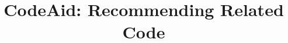 \documentclass[conference]{IEEEtran}
\begin{document}
\newcommand\todo[1]{\textcolor{red}{TODO: #1}}

\makeatletter
\newcommand{\removelatexerror}{\let\@latex@error\@gobble}
\makeatother


\title{CodeAid: Recommending Related Code
}


\maketitle
\end{document}
